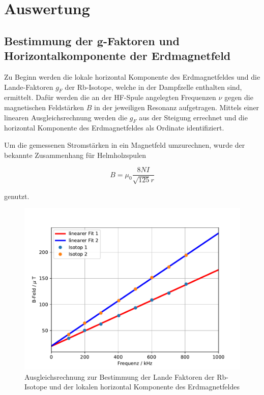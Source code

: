 \section{Auswertung}
\subsection{Bestimmung der g-Faktoren und Horizontalkomponente der Erdmagnetfeld}
Zu Beginn werden die lokale horizontal Komponente des Erdmagnetfeldes und die Lande-Faktoren $g_F$ der Rb-Isotope, welche in der Dampfzelle enthalten sind, ermittelt.
Dafür werden die an der HF-Spule angelegten Frequenzen $\nu$ gegen die magnetischen Feldstärken $B$ in der jeweiligen Resonanz aufgetragen. Mittels einer linearen Ausgleichsrechnung werden die $g_F$ aus der Steigung errechnet und die horizontal Komponente des Erdmagnetfeldes als Ordinate identifiziert.

Um die gemessenen Stromstärken in ein Magnetfeld umzurechnen, wurde der bekannte Zusammenhang für Helmholzspulen

\begin{equation}
B = \mu_0 \frac{8NI}{\sqrt{125} r}
\end{equation}

genutzt.

\begin{figure}[h]
\centering
\includegraphics[scale=0.8]{img/plotLande.pdf}
\caption{Ausgleichsrechnung zur Bestimmung der Lande Faktoren der Rb-Isotope und der lokalen horizontal Komponente des Erdmagnetfeldes}
\label{abb:gfak}
\end{figure}

